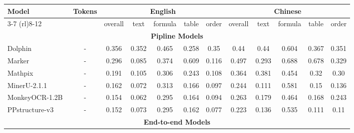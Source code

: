 \documentclass[11pt, a4paper, logo, copyright, nonumbering]{deepseek}
\begin{document}
\begin{CJK*}{UTF8}{gbsn}
\begin{table}[!t]
{		\begin{tabular}{lccccccccccc}
			\toprule 
            \multirow{3}{*}{\textbf{Model}} & \multirow{3}{*}{\textbf{Tokens}} & \multicolumn{5}{c}{\textbf{English}} &\multicolumn{5}{c}{\textbf{Chinese}} \\
            \cmidrule(rl){3-7}  \cmidrule(rl){8-12} 
            & & \cellcolor{yellow!30} overall  & text & formula & table & order & \cellcolor{yellow!30} overall & text & formula & table &order \\
			\midrule  
            \multicolumn{12}{c}{\textbf{Pipline Models}} \\ 
            \midrule 
			Dolphin~\cite{feng2025dolphin}& - & 0.356  & 0.352 & 0.465 & 0.258 &0.35 & 0.44 & 0.44 & 0.604 & 0.367 & 0.351 \\
			Marker~\cite{marker}& -  & 0.296 & 0.085 & 0.374 & 0.609 & 0.116 & 0.497 & 0.293 & 0.688 & 0.678 & 0.329\\
			  Mathpix~\cite{mathpix}& - & 0.191 & 0.105 & 0.306 & 0.243 & 0.108 & 0.364 & 0.381 & 0.454 & 0.32 & 0.30 \\
            MinerU-2.1.1~\cite{wang2024mineru}& - & 0.162 & 0.072 & 0.313 & 0.166 & 0.097 & 0.244 & 0.111 & 0.581 & 0.15 & 0.136 \\
            MonkeyOCR-1.2B~\cite{li2025monkeyocr}& - & 0.154 & 0.062 & 0.295 & 0.164 & 0.094 & 0.263 & 0.179 & 0.464 & 0.168 & 0.243 \\
            PPstructure-v3~\cite{cui2025paddleocr}& - & 0.152 & 0.073 & 0.295 & 0.162 & 0.077 & 0.223 & 0.136 & 0.535 & 0.111 & 0.11 \\
			\midrule  
            \multicolumn{12}{c}{\textbf{End-to-end Models}} \\ 

\end{tabular}}
\end{table}
\end{CJK*}
\end{document}
